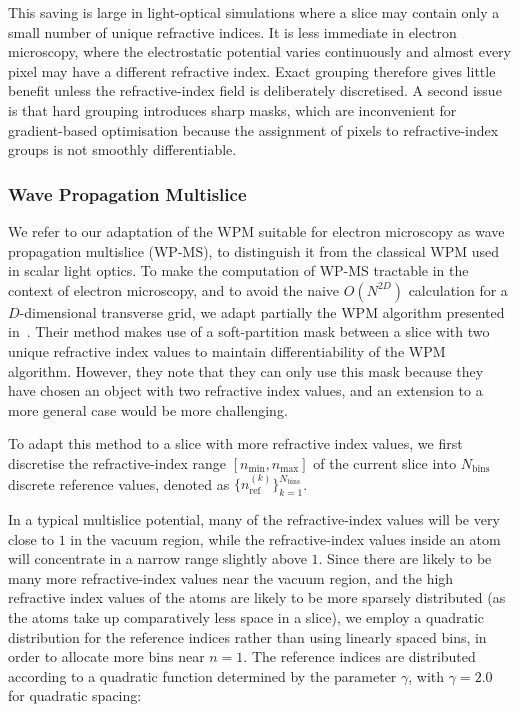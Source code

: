 \documentclass[preprint,12pt,number]{elsarticle}
\begin{document}
This saving is large in light-optical simulations where a slice may contain only
a small number of unique refractive indices. It is less immediate in electron
microscopy, where the electrostatic potential varies continuously and almost
every pixel may have a different refractive index. Exact grouping therefore
gives little benefit unless the refractive-index field is deliberately
discretised. A second issue is that hard grouping introduces sharp masks, which
are inconvenient for gradient-based optimisation because the assignment of pixels
to refractive-index groups is not smoothly differentiable.

\subsubsection{Wave Propagation Multislice}
\label{sec:wp_ms}

We refer to our adaptation of the WPM suitable for electron microscopy as wave propagation
multislice (WP-MS), to distinguish it from the classical WPM used in scalar
light optics. To make the computation of WP-MS tractable in the context of electron microscopy, and to avoid the naive
$O(N^{2D})$ calculation for a $D$-dimensional transverse grid, we adapt partially the WPM
algorithm presented in~\cite{BarreBrunel2025}. Their method makes use of a soft-partition 
mask between a slice with two unique refractive index values to maintain differentiability of 
the WPM algorithm. However, they note that they can only use this mask because they have chosen an object 
with two refractive index values, and an extension to a more general case would be more challenging.

To adapt this method to a slice with more refractive index values, we first discretise the refractive-index range
$[n_{\mathrm{min}}, n_{\mathrm{max}}]$ of the current slice into
$N_{\mathrm{bins}}$ discrete reference values, denoted as
$\{n_{\mathrm{ref}}^{(k)}\}_{k=1}^{N_{\mathrm{bins}}}$.

In a typical multislice potential, many of the refractive-index values will be
very close to $1$ in the vacuum region, while the refractive-index values inside
an atom will concentrate in a narrow range slightly above $1$. Since there are
likely to be many more refractive-index values near the vacuum region, and the high refractive index 
values of the atoms are likely to be more sparsely distributed (as the atoms take up comparatively less 
space in a slice), we employ
a quadratic distribution for the reference indices rather than using linearly
spaced bins, in order to allocate more bins near $n=1$. The reference indices
are distributed according to a quadratic function determined by the parameter
$\gamma$, with $\gamma=2.0$ for quadratic spacing:
\end{document}
